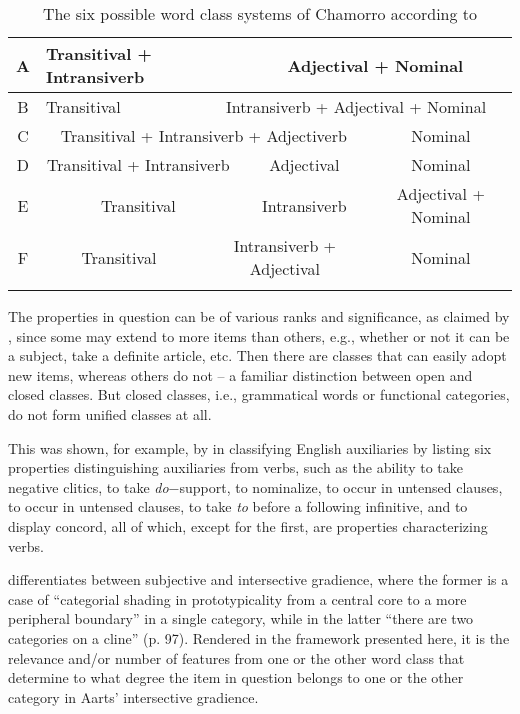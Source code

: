 \documentclass[output=paper]{langsci/langscibook}
\begin{document}
\begin{table}[htpb]
\centering
{\small
\begin{tabularx}{1\textwidth}{cp{2.24cm}p{2.24cm}p{2.24cm}p{2.24cm}}
\lsptoprule
A & \multicolumn{2}{C|}{Transitival + Intransiverb} & \multicolumn{2}{c}{Adjectival + Nominal}\\
\midrule
B & \multicolumn{1}{C|}{Transitival} & \multicolumn{3}{c}{Intransiverb + Adjectival + Nominal}\\
\midrule
C & \multicolumn{3}{c|}{Transitival + Intransiverb + Adjectiverb} & \multicolumn{1}{c}{Nominal}\\
\midrule
D & \multicolumn{2}{c|}{Transitival + Intransiverb} &
\multicolumn{1}{c|}{Adjectival} & \multicolumn{1}{c}{Nominal}\\
\midrule
E & \multicolumn{2}{c|}{Transitival} & \multicolumn{1}{c|}{Intransiverb} & \multicolumn{1}{c}{Adjectival + Nominal}\\
\midrule
F & \multicolumn{1}{c}{Transitival} & \multicolumn{2}{|c|}{Intransiverb + Adjectival} & \multicolumn{1}{c}{Nominal}\\
\lspbottomrule
\end{tabularx}
}
\caption{The six possible word class systems of Chamorro according to
\textcite{Haspelmath2012}}\label{tab:key:27.2}
\end{table}

The properties in question can be of various ranks and significance, as claimed
by \citet{Crystal1967}, since some may extend to more items than others, e.g.,
whether or not it can be a subject, take a definite article, etc. Then there
are classes that can easily adopt new items, whereas others do not – a familiar
distinction between open and closed classes. But closed classes, i.e.,
grammatical words or functional categories, do not form unified classes at all.

This was shown, for example, by \citet{Radford1976} in classifying English
auxiliaries by listing six properties distinguishing auxiliaries from verbs,
such as the ability to take negative clitics, to take \emph{do}−support, to
nominalize, to occur in untensed clauses, to occur in untensed clauses, to take
\emph{to} before a following infinitive, and to display concord, all of which,
except for the first, are properties characterizing verbs.

\citet{Aarts2007} differentiates between subjective and intersective gradience,
where the former is a case of “categorial shading in prototypicality from a
central core to a more peripheral boundary” in a single category, while in the
latter “there are two categories on a cline” (p. 97). Rendered in the framework
presented here, it is the relevance and/or number of features from one or the
other word class that determine to what degree the item in question belongs
to one or the other category in Aarts’ intersective gradience.
\end{document}
